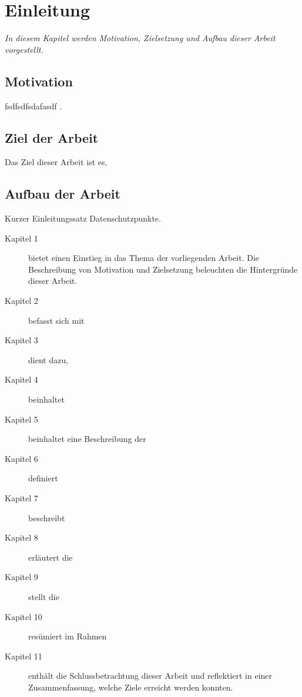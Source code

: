 \chapter{Einleitung}\textit{In diesem Kapitel werden Motivation, Zielsetzung und
Aufbau dieser Arbeit vorgestellt.}
\section{Motivation} fsdfsdfsdafasdf \cite[vgl.][S. 1]{reimann_betrieblicher_2013}.
\section{Ziel der Arbeit} Das Ziel dieser Arbeit ist es,
\section{Aufbau der Arbeit}Kurzer Einleitungssatz
Datenschutzpunkte. \begin{description}%
\item [Kapitel 1] bietet einen Einstieg in das Thema der
vorliegenden Arbeit. Die Beschreibung von Motivation und Zielsetzung beleuchten die Hintergründe dieser Arbeit.
\item [Kapitel 2] befasst sich mit
\item [Kapitel 3] dient dazu, 
\item [Kapitel 4] beinhaltet 
\item [Kapitel 5] beinhaltet eine Beschreibung der
\item [Kapitel 6] definiert
\item [Kapitel 7] beschreibt 
\item [Kapitel 8] erläutert die 
\item [Kapitel 9] stellt die 
\item [Kapitel 10] resümiert im Rahmen 
\item [Kapitel 11] enthält die Schlussbetrachtung dieser Arbeit und reflektiert
in einer Zusammenfassung, welche Ziele erreicht werden konnten.
\end{description}